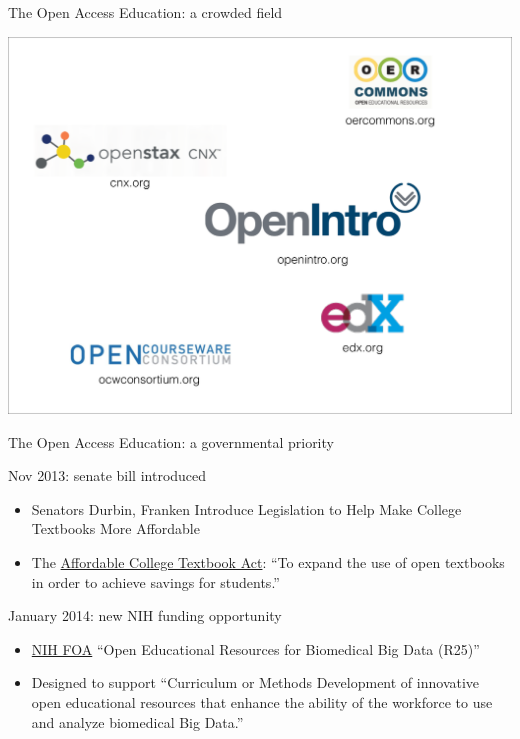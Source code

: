 
\begin{frame}{The Open Access Education: a crowded field}

\includegraphics[width=\linewidth]{openEdLogos}

\end{frame}


\begin{frame}{The Open Access Education: a governmental priority}

\begin{block}{Nov 2013: senate bill introduced}
\begin{itemize}
\item Senators Durbin, Franken Introduce Legislation to Help Make College Textbooks More Affordable

\item The \href{http://thomas.loc.gov/cgi-bin/query/z?c113:S.1704:}{Affordable College Textbook Act}: ``To expand the use of open textbooks in order to achieve savings for students.''
\end{itemize}
\end{block}

\begin{block}{January 2014: new NIH funding opportunity}
\begin{itemize}
\item \href{http://grants.nih.gov/grants/guide/rfa-files/RFA-HG-14-009.html}{NIH FOA} ``Open Educational Resources for Biomedical Big Data (R25)''
\item Designed to support ``Curriculum or Methods Development of innovative open educational resources that enhance the ability of the workforce to use and analyze biomedical Big Data.''
\end{itemize}
\end{block}

\end{frame}



